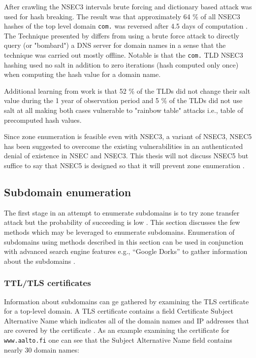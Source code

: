 After crawling the NSEC3 intervals brute forcing and dictionary based attack was used for hash breaking. The result was that approximately 64 \% of all NSEC3 hashes of the top level domain \texttt{com.} was reversed after 4.5 days of computation \cite{NSEC3_hash_breaking}. The Technique presented by \citet{NSEC3_hash_breaking} differs from using a brute force attack to directly query (or "bombard") a DNS server for domain names in a sense that the technique was carried out mostly offline. Notable is that the \texttt{com.} TLD NSEC3 hashing  used no salt in addition to zero iterations (hash computed only once) when computing the hash value for a domain name.


Additional learning from \citet{NSEC3_hash_breaking} work is that 52 \% of the TLDs did not change their salt value during the 1 year of observation period and 5 \% of the TLDs did not use salt at all making both cases vulnerable to "rainbow table" attacks i.e., table of precomputed hash values.

Since zone enumeration is feasible even with NSEC3, a variant of NSEC3, NSEC5 \cite{NSEC5} has been suggested to overcome the existing vulnerabilities in an authenticated denial of existence in NSEC and NSEC3. This thesis will not discuss NSEC5 but suffice to say that NSEC5 is designed so that it will prevent zone enumeration \cite{NSEC5_provably}. 



\subsection{Subdomain enumeration}

The first stage in an attempt to enumerate subdomains is to try zone transfer attack but the probability of succeeding is low \cite{NSEC3_hash_breaking}. This section discusses the few methods which may be leveraged to enumerate subdomains. Enumeration of subdomains using methods described in this section can be used in conjunction with advanced search engine features e.g., “Google Dorks” to gather information about the subdomains \cite{hacking_exposed}.


\subsubsection{TTL/TLS certificates}

Information about subdomains can ge gathered by examining the TLS certificate for a top-level domain. A TLS certificate contains a field Certificate Subject Alternative Name which indicates all of the domain names and IP addresses that are covered by the certificate \citep{hacking_exposed}. As an example examining the certificate for \texttt{www.aalto.fi} one can see that the Subject Alternative Name field contains nearly 30 domain names:

